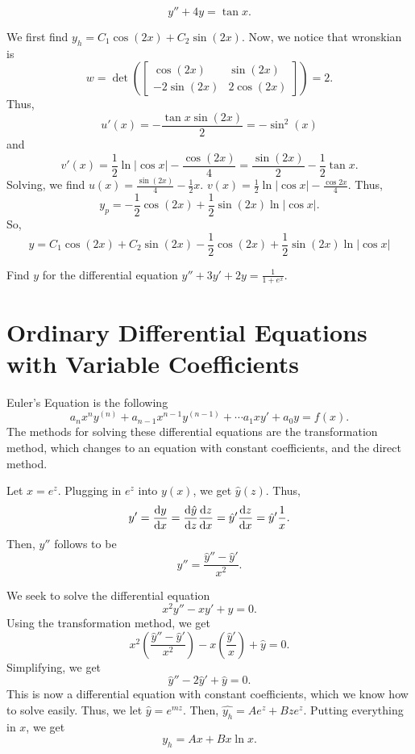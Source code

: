 \begin{example}
    $$y''+4y = \tan x.$$
\end{example}
\begin{soln}
    We first find $y_h = C_1\cos(2x)+C_2\sin(2x)$. Now, we notice that
    wronskian is 
    $$w = \det \left( \begin{bmatrix}\cos(2x)&\sin(2x) \\ -2\sin(2x) & 2\cos(2x) \end{bmatrix}\right)
    =2.$$ Thus, $$u'(x) = -\frac{\tan x \sin (2x)}{2} = -\sin^2(x)$$
    and $$v'(x) = \frac{1}{2}\ln |\cos x| - \frac{\cos(2x)}{4} = \frac{\sin(2x)}{2}-\frac{1}{2}\tan x.$$
    Solving, we find $u(x) = \frac{\sin(2x)}{4} - \frac{1}{2}x$. 
    $v(x) = \frac{1}{2}\ln |\cos x| - \frac{\cos 2x}{4}$. Thus,
    $$y_p = -\frac{1}{2}\cos(2x)+\frac{1}{2}\sin(2x)\ln |\cos x|.$$
    So, $$y = C_1\cos(2x)+C_2\sin(2x)-\frac{1}{2}\cos(2x)+\frac{1}{2}\sin(2x)\ln |\cos x|$$
\end{soln}
\begin{exercise}
    Find $y$ for the differential equation $y''+3y'+2y=\frac{1}{1+e^x}$.
\end{exercise}

\section{Ordinary Differential Equations with Variable Coefficients}
\alert{Euler's Equation} is the following
$$a_nx^ny^{(n)} + a_{n-1}x^{n-1}y^{(n-1)} + \cdots a_1xy'+a_0y = f(x).$$
The methods for solving these differential equations are the 
\alert{transformation method}, which changes to an equation with constant
coefficients, and the \alert{direct method}.

\begin{theorem}
    Let $x = e^{z}$. Plugging in $e^z$ into $y(x)$, we get $\hat{y}(z)$.
    Thus, $$y' = \frac{\dif y}{\dif x} = \frac{\dif \hat{y}}{\dif z}\frac{\dif z}{\dif x} = 
    \hat{y}' \frac{\dif z}{\dif x} = \hat{y}' \frac{1}{x}.$$ Then, $y''$ follows
    to be $$y'' = \frac{\hat{y}''-\hat{y}'}{x^2}.$$
\end{theorem}
\begin{example}
    We seek to solve the differential equation $$x^2y''-xy'+y=0.$$
    Using the transformation method, we get
    $$x^2\left(\frac{\hat{y}''-\hat{y}'}{x^2}\right) 
    - x\left( \frac{\hat{y}'}{x}\right)+\hat{y} = 0.$$ Simplifying,
    we get $$\hat{y}''-2\hat{y}'+\hat{y} = 0.$$ This is now a differential
    equation with constant coefficients, which we know how to solve easily.
    Thus, we let $\hat{y} = e^{mz}$. Then, $\hat{y_h} = Ae^{z}+Bze^{z}$. Putting
    everything in $x$, we get $$y_h = Ax+Bx\ln x.$$
\end{example}

